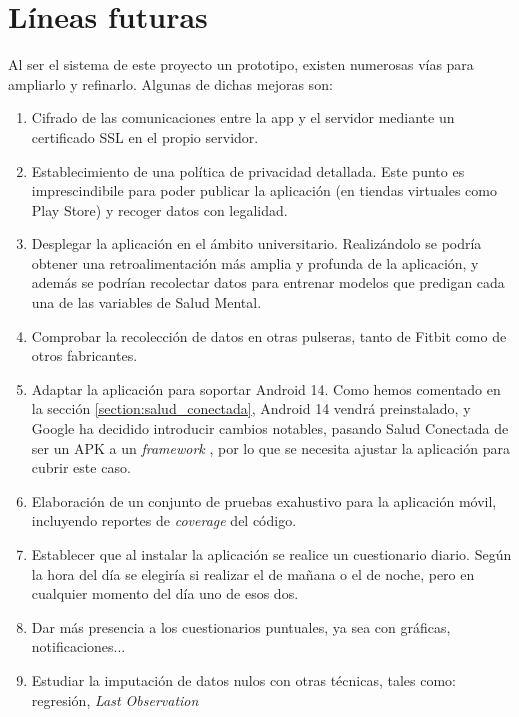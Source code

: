 \chapter{Líneas futuras}
\label{chapter:lineas}



Al ser el sistema de este proyecto un prototipo, existen numerosas vías para ampliarlo y refinarlo. Algunas de dichas
mejoras son:

\begin{enumerate}
    \item Cifrado de las comunicaciones entre la app y el servidor mediante un certificado SSL en el propio servidor.
    \item Establecimiento de una política de privacidad detallada. Este punto es imprescindibile para poder publicar la
    aplicación (en tiendas virtuales como Play Store) y recoger datos con legalidad.
    \item Desplegar la aplicación en el ámbito universitario. Realizándolo se podría obtener una retroalimentación más
    amplia y profunda de la aplicación, y además se podrían recolectar datos para entrenar
    modelos que predigan cada una de las variables de Salud Mental.
    \item Comprobar la recolección de datos en otras pulseras, tanto de Fitbit como de otros fabricantes.
    \item Adaptar la aplicación para soportar Android 14. Como hemos comentado en la sección 
    \ref{section:salud_conectada}, Android 14 vendrá preinstalado, y Google ha decidido introducir cambios notables, 
    pasando Salud Conectada de ser un APK a un \textit{framework} \cite{noauthor_como_nodate-1}, por lo que se necesita
    ajustar la aplicación para cubrir este caso.
    \item Elaboración de un conjunto de pruebas exahustivo para la aplicación móvil, incluyendo reportes de 
    \textit{coverage} del código.
    \item Establecer que al instalar la aplicación se realice un cuestionario diario. Según la hora del día se elegiría
    si realizar el de mañana o el de noche, pero en cualquier momento del día uno de esos dos.
    \item Dar más presencia a los cuestionarios puntuales, ya sea con gráficas, notificaciones...
    \item Estudiar la imputación de datos nulos con otras técnicas, tales como: regresión, \textit{Last Observation 
}
\end{enumerate}
